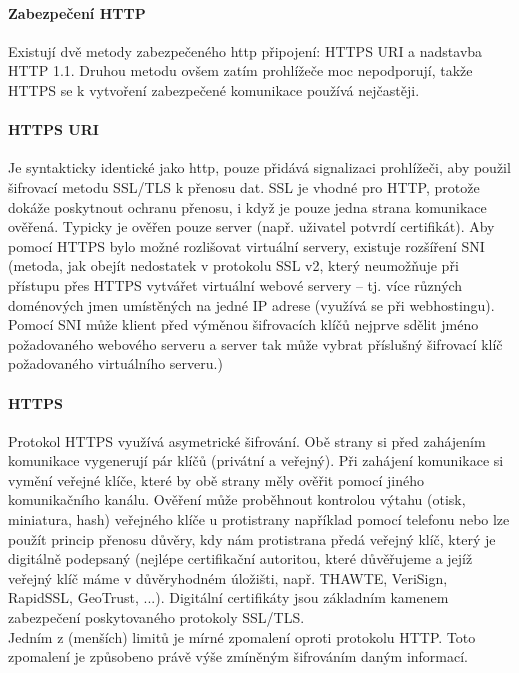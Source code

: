 \documentclass[10pt,a4paper]{article}
\begin{document}
\paragraph{Zabezpečení HTTP}
Existují dvě metody zabezpečeného http připojení: HTTPS URI a nadstavba HTTP 1.1. Druhou metodu ovšem zatím prohlížeče moc nepodporují, takže HTTPS se k vytvoření zabezpečené komunikace používá nejčastěji.
\paragraph{HTTPS URI} Je syntakticky identické jako http, pouze přidává signalizaci prohlížeči, aby použil šifrovací metodu SSL/TLS k přenosu dat. SSL je vhodné pro HTTP, protože dokáže poskytnout ochranu přenosu, i když je pouze jedna strana komunikace ověřená. Typicky je ověřen pouze server (např. uživatel potvrdí certifikát). Aby pomocí HTTPS bylo možné rozlišovat virtuální servery, existuje rozšíření SNI (metoda, jak obejít nedostatek v protokolu SSL v2, který neumožňuje při přístupu přes HTTPS vytvářet virtuální webové servery – tj. více různých doménových jmen umístěných na jedné IP adrese (využívá se při webhostingu). Pomocí SNI může klient před výměnou šifrovacích klíčů nejprve sdělit jméno požadovaného webového serveru a server tak může vybrat příslušný šifrovací klíč požadovaného virtuálního serveru.)
\paragraph{HTTPS} Protokol HTTPS využívá asymetrické šifrování. Obě strany si před zahájením komunikace vygenerují pár klíčů (privátní a veřejný). Při zahájení komunikace si vymění veřejné klíče, které by obě strany měly ověřit pomocí jiného komunikačního kanálu. Ověření může proběhnout kontrolou výtahu (otisk, miniatura, hash) veřejného klíče u protistrany například pomocí telefonu nebo lze použít princip přenosu důvěry, kdy nám protistrana předá veřejný klíč, který je digitálně podepsaný (nejlépe certifikační autoritou, které důvěřujeme a jejíž veřejný klíč máme v důvěryhodném úložišti, např. THAWTE, VeriSign, RapidSSL, GeoTrust, ...). Digitální certifikáty jsou základním kamenem zabezpečení poskytovaného protokoly SSL/TLS. \\
Jedním z (menších) limitů je mírné zpomalení oproti protokolu HTTP. Toto zpomalení je způsobeno právě výše zmíněným šifrováním daným informací.
\end{document}
